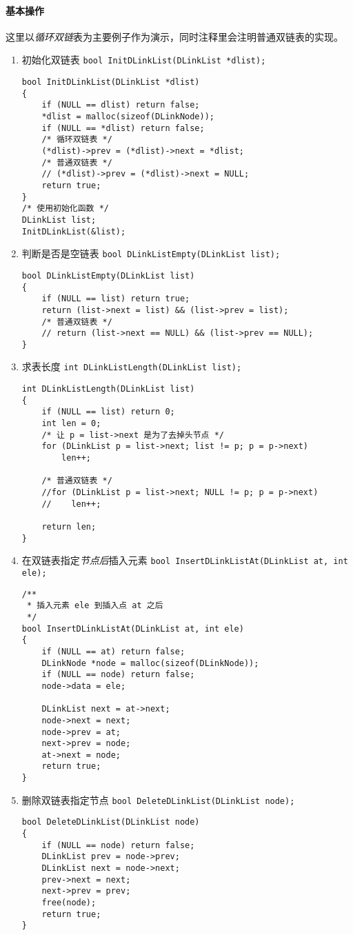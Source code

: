 \documentclass{ctexart}
\begin{document}
\paragraph{基本操作} 这里以\emph{循环双链}表为主要例子作为演示，同时注释里会注明普通双链表的实现。
\begin{enumerate}
\item 初始化双链表 \texttt{bool InitDLinkList(DLinkList *dlist);}
\begin{verbatim}
bool InitDLinkList(DLinkList *dlist)
{
    if (NULL == dlist) return false;
    *dlist = malloc(sizeof(DLinkNode));
    if (NULL == *dlist) return false;
    /* 循环双链表 */
    (*dlist)->prev = (*dlist)->next = *dlist;
    /* 普通双链表 */
    // (*dlist)->prev = (*dlist)->next = NULL;
    return true;
}
/* 使用初始化函数 */
DLinkList list;
InitDLinkList(&list);
\end{verbatim}

\item 判断是否是空链表 \texttt{bool DLinkListEmpty(DLinkList list);}
\begin{verbatim}
bool DLinkListEmpty(DLinkList list)
{
    if (NULL == list) return true;
    return (list->next = list) && (list->prev = list);
    /* 普通双链表 */
    // return (list->next == NULL) && (list->prev == NULL);
}
\end{verbatim}

\item 求表长度 \texttt{int DLinkListLength(DLinkList list);}
\begin{verbatim}
int DLinkListLength(DLinkList list)
{
    if (NULL == list) return 0;
    int len = 0;
    /* 让 p = list->next 是为了去掉头节点 */
    for (DLinkList p = list->next; list != p; p = p->next)
        len++;

    /* 普通双链表 */
    //for (DLinkList p = list->next; NULL != p; p = p->next)
    //    len++;

    return len;
}
\end{verbatim}

\item 在双链表指定\emph{节点后}插入元素 \texttt{bool InsertDLinkListAt(DLinkList at, int ele);}
\begin{verbatim}
/**
 * 插入元素 ele 到插入点 at 之后
 */
bool InsertDLinkListAt(DLinkList at, int ele)
{
    if (NULL == at) return false;
    DLinkNode *node = malloc(sizeof(DLinkNode));
    if (NULL == node) return false;
    node->data = ele;

    DLinkList next = at->next;
    node->next = next;
    node->prev = at;
    next->prev = node;
    at->next = node;
    return true;
}
\end{verbatim}

\item 删除双链表指定节点 \texttt{bool DeleteDLinkList(DLinkList node);}
\begin{verbatim}
bool DeleteDLinkList(DLinkList node)
{
    if (NULL == node) return false;
    DLinkList prev = node->prev;
    DLinkList next = node->next;
    prev->next = next;
    next->prev = prev;
    free(node);
    return true;
}
\end{verbatim}
\end{enumerate}
\end{document}
